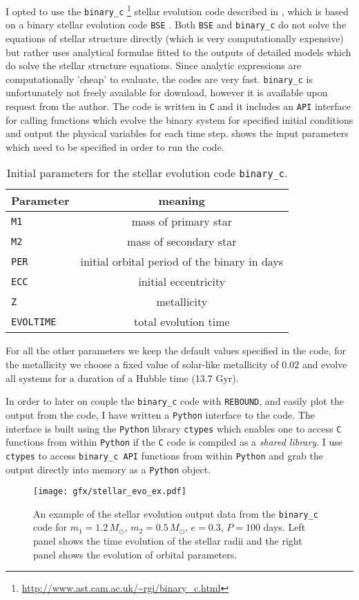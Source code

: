 \documentclass[ twoside,openright,titlepage,numbers=noenddot,headinclude,%
                footinclude=true,cleardoublepage=empty,abstractoff, %
                BCOR=5mm,paper=a4,fontsize=11pt,%
                american,%
                ]{scrreprt}
\begin{document}
I opted to use the \texttt{binary\_c}
\footnote{\url{http://www.ast.cam.ac.uk/~rgi/binary_c.html}}
stellar evolution code described in
\cite{izzard2004,izzard2006,izzard2009}, which is based on a binary
stellar evolution code \texttt{BSE} \citep{hurley2002}. Both \texttt{BSE}
and \texttt{binary\_c} do not solve the equations of stellar structure directly
(which is very computationally expensive) but rather uses analytical formulae
fitted to the outputs of detailed models which do solve the stellar structure
equations. Since analytic expressions are computationally 'cheap' to evaluate,
the codes are very fast. \texttt{binary\_c}
is unfortunately not freely available for download, however it is available
upon request from the author. The code is written in \texttt{C} and it
includes an \texttt{API} interface for calling functions which 
evolve the binary system for specified initial conditions and output the
physical variables for each time step.  shows
the input parameters which need to be specified in order to run the code.
\begin{table}[h!]
\centering
\begin{tabular}{lc}
\toprule
    Parameter & meaning\\
\midrule
    \texttt{M1} & mass of primary star\\
    \texttt{M2} & mass of secondary star\\
    \texttt{PER} & initial orbital period of the binary in days\\
    \texttt{ECC} & initial eccentricity\\
    \texttt{Z} & metallicity\\
    \texttt{EVOLTIME} & total evolution time\\
\bottomrule
\end{tabular}
    \caption{Initial parameters for the stellar evolution code \texttt{binary\_c}.}
\label{table:binary_c_params}
\end{table}
For all the other parameters we keep the default values specified in the code, for 
the metallicity we choose a fixed value of solar-like metallicity of $0.02$ and 
evolve all systems for a duration of a Hubble time (13.7 Gyr).

In order to later on couple the \texttt{binary\_c} code with \texttt{REBOUND},
and easily plot the output from the code, I have written a \texttt{Python}
interface to the code. The interface is built using the \texttt{Python} 
library \texttt{ctypes} which enables one to access \texttt{C} functions
from within \texttt{Python} if the \texttt{C} code is compiled as a \emph{
    shared library}. I use \texttt{ctypes} to access \texttt{binary\_c API}
functions from within \texttt{Python} and grab the output directly into memory
as a \texttt{Python} object.
\begin{figure}[htb]
\centering
\texttt{[image: gfx/stellar\_evo\_ex.pdf]}
\caption{An example of the stellar evolution output data from the \texttt{binary\_c}
    code for $m_1=1.2\,M_\odot$, $m_2=0.5\,M_\odot$, $e=0.3$, $P=100$ days. Left
    panel shows the time evolution of the stellar radii and the right panel shows
    the evolution of orbital parameters.}
\label{fig:stellar_evo_ex}
\end{figure}
\end{document}
